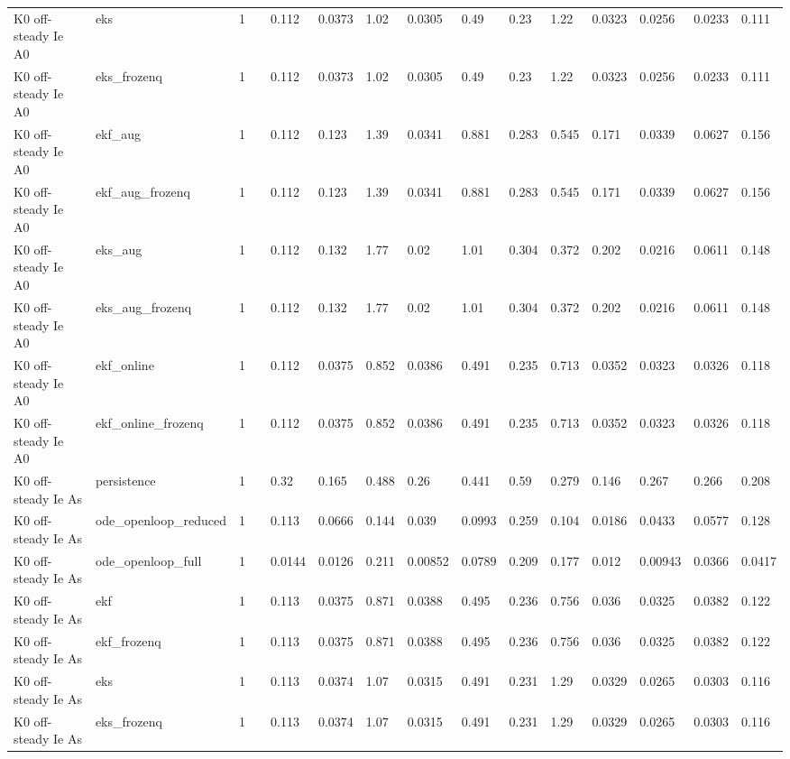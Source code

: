 \begin{table}[t]
\begin{tabular}{lllllllllllllll}
K0 off-steady Ie A0 & eks & 1 &  & 0.112 & 0.0373 & 1.02 & 0.0305 & 0.49 & 0.23 & 1.22 & 0.0323 & 0.0256 & 0.0233 & 0.111 \\
K0 off-steady Ie A0 & eks\_frozenq & 1 &  & 0.112 & 0.0373 & 1.02 & 0.0305 & 0.49 & 0.23 & 1.22 & 0.0323 & 0.0256 & 0.0233 & 0.111 \\
K0 off-steady Ie A0 & ekf\_aug & 1 &  & 0.112 & 0.123 & 1.39 & 0.0341 & 0.881 & 0.283 & 0.545 & 0.171 & 0.0339 & 0.0627 & 0.156 \\
K0 off-steady Ie A0 & ekf\_aug\_frozenq & 1 &  & 0.112 & 0.123 & 1.39 & 0.0341 & 0.881 & 0.283 & 0.545 & 0.171 & 0.0339 & 0.0627 & 0.156 \\
K0 off-steady Ie A0 & eks\_aug & 1 &  & 0.112 & 0.132 & 1.77 & 0.02 & 1.01 & 0.304 & 0.372 & 0.202 & 0.0216 & 0.0611 & 0.148 \\
K0 off-steady Ie A0 & eks\_aug\_frozenq & 1 &  & 0.112 & 0.132 & 1.77 & 0.02 & 1.01 & 0.304 & 0.372 & 0.202 & 0.0216 & 0.0611 & 0.148 \\
K0 off-steady Ie A0 & ekf\_online & 1 &  & 0.112 & 0.0375 & 0.852 & 0.0386 & 0.491 & 0.235 & 0.713 & 0.0352 & 0.0323 & 0.0326 & 0.118 \\
K0 off-steady Ie A0 & ekf\_online\_frozenq & 1 &  & 0.112 & 0.0375 & 0.852 & 0.0386 & 0.491 & 0.235 & 0.713 & 0.0352 & 0.0323 & 0.0326 & 0.118 \\
K0 off-steady Ie As & persistence & 1 &  & 0.32 & 0.165 & 0.488 & 0.26 & 0.441 & 0.59 & 0.279 & 0.146 & 0.267 & 0.266 & 0.208 \\
K0 off-steady Ie As & ode\_openloop\_reduced & 1 &  & 0.113 & 0.0666 & 0.144 & 0.039 & 0.0993 & 0.259 & 0.104 & 0.0186 & 0.0433 & 0.0577 & 0.128 \\
K0 off-steady Ie As & ode\_openloop\_full & 1 &  & 0.0144 & 0.0126 & 0.211 & 0.00852 & 0.0789 & 0.209 & 0.177 & 0.012 & 0.00943 & 0.0366 & 0.0417 \\
K0 off-steady Ie As & ekf & 1 &  & 0.113 & 0.0375 & 0.871 & 0.0388 & 0.495 & 0.236 & 0.756 & 0.036 & 0.0325 & 0.0382 & 0.122 \\
K0 off-steady Ie As & ekf\_frozenq & 1 &  & 0.113 & 0.0375 & 0.871 & 0.0388 & 0.495 & 0.236 & 0.756 & 0.036 & 0.0325 & 0.0382 & 0.122 \\
K0 off-steady Ie As & eks & 1 &  & 0.113 & 0.0374 & 1.07 & 0.0315 & 0.491 & 0.231 & 1.29 & 0.0329 & 0.0265 & 0.0303 & 0.116 \\
K0 off-steady Ie As & eks\_frozenq & 1 &  & 0.113 & 0.0374 & 1.07 & 0.0315 & 0.491 & 0.231 & 1.29 & 0.0329 & 0.0265 & 0.0303 & 0.116 \\

\end{tabular}
\end{table}
